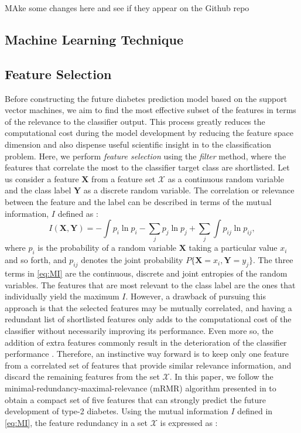 \documentclass[journal,comsoc]{IEEEtran}
\begin{document}
MAke some changes here and see if they appear on the Github repo


\subsection{Machine Learning Technique}
%



\subsection{Feature Selection}
%
Before constructing the future diabetes prediction model based on the support vector machines, we aim to find the most effective subset of the features in terms of the relevance to the classifier output. This process greatly reduces the computational cost during the model development by reducing the feature space dimension and also dispense useful scientific insight in to the classification problem. Here, we perform \emph{feature selection} using the \emph{filter} method, where the features that correlate the most to the classifier target class are shortlisted. Let us consider a feature $\mathbf{X}$ from a feature set $\mathcal X$ as a continuous random variable and the class label $\mathbf{Y}$ as a discrete random variable. The correlation or relevance between the feature and the label can be described in terms of the mutual information, $I$ defined as \cite{ross2014mutual}:
%
\begin{equation}
    I(\mathbf{X}, \mathbf{Y}) = - \int p_i\ln p_i - \sum_j p_j\ln p_j + \sum_j \int p_{ij}\ln p_{ij},
    \label{eq:MI}
\end{equation}
%
where $p_{i}$ is the probability of a random variable $\mathbf{X}$ taking a particular value $x_i$ and so forth, and $p_{ij}$ denotes the joint probability $P\{\mathbf{X}= x_i, \mathbf{Y}=y_j\}$. The three terms in \eqref{eq:MI} are the continuous, discrete and joint entropies of the random variables. The features that are most relevant to the class label are the ones that individually yield the maximum $I$. However, a drawback of pursuing this approach is that the selected features may be mutually correlated, and having a redundant list of shortlisted features only adds to the computational cost of the classifier without necessarily improving its performance. Even more so, the addition of extra features commonly result in the deterioration of the classifier performance \cite{trunk1979problem}. Therefore, an instinctive way forward is to keep only one feature from a correlated set of features that provide similar relevance information, and discard the remaining features from the set $\mathcal X$. In this paper, we follow the minimal-redundancy-maximal-relevance (mRMR) algorithm presented in \cite{mRMR} to obtain a compact set of five features that can strongly predict the future development of type-2 diabetes. Using the mutual information $I$ defined in \eqref{eq:MI}, the feature redundancy in a set $\mathcal{X}$ is expressed as \cite{mRMR}:
\end{document}

